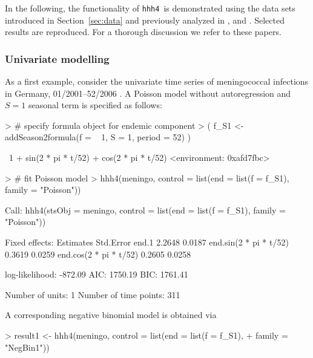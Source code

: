 \documentclass[a4paper,11pt]{article}
\newcommand{\hhh}{\texttt{hhh4}}
\begin{document}
In the following, the functionality of \hhh\ is demonstrated using
the data sets introduced in Section~\ref{sec:data}
and previously analyzed in \cite{paul-etal-2008}, \cite{paul-held-2011} and 
\cite{herzog-etal-2010}.
Selected results are reproduced. For a thorough discussion 
we refer to these papers.

\subsubsection{Univariate modelling}

As a first example, consider the univariate time series of meningococcal infections
in Germany, 01/2001--52/2006 \citep[cf.~Tab.~1 in ][]{paul-etal-2008}.
A Poisson model without autoregression and $S=1$ seasonal term is specified 
as follows:
\begin{Schunk}
\begin{Sinput}
> # specify formula object for endemic component
> ( f_S1 <- addSeason2formula(f = ~ 1, S = 1, period = 52) )
\end{Sinput}
\begin{Soutput}
~1 + sin(2 * pi * t/52) + cos(2 * pi * t/52)
<environment: 0xafd7fbc>
\end{Soutput}
\begin{Sinput}
> # fit Poisson model
> hhh4(meningo, control = list(end = list(f = f_S1), family = "Poisson")) 
\end{Sinput}
\begin{Soutput}
Call: 
hhh4(stsObj = meningo, control = list(end = list(f = f_S1), family = "Poisson"))


Fixed effects: 
                        Estimates  Std.Error
end.1                      2.2648     0.0187
end.sin(2 * pi * t/52)     0.3619     0.0259
end.cos(2 * pi * t/52)     0.2605     0.0258

log-likelihood:    -872.09 
AIC:               1750.19 
BIC:               1761.41 

Number of units:          1 
Number of time points:    311 
\end{Soutput}
\end{Schunk}
A corresponding negative binomial model is obtained via
\begin{Schunk}
\begin{Sinput}
> result1 <- hhh4(meningo, control = list(end = list(f = f_S1), 
+                                         family = "NegBin1")) 
\end{Sinput}
\end{Schunk}
\end{document}
